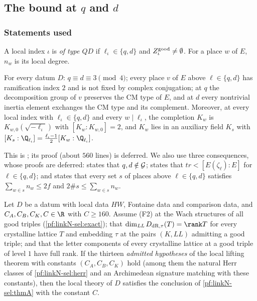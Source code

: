\subsection{The bound at \texorpdfstring{$q$}{q} and \texorpdfstring{$d$}{d}}\label{sec:pf:linkN-sel:thmB}

\subsubsection{Statements used}

A local index $\iota$ is \emph{of type $QD$} if $\ell_\iota\in\{q,d\}$ and $Z^{\mathrm{good}}_\iota\ne\emptyset$. For a place $w$ of $E$, $n_w$
is its local degree.

\begin{lemma}\label{pf:linkN-sel:qdfields}
For every datum $D$: $q\equiv d\equiv3\pmod4$; every place $v$ of $E$ above $\ell\in\{q,d\}$ has ramification index $2$ and is not fixed
by complex conjugation; at $q$ the decomposition group of $v$ preserves the CM type of $E$, and at $d$ every nontrivial inertia element
exchanges the CM type and its complement. Moreover, at every local index with $\ell_\iota\in\{q,d\}$ and every $w\mid\ell_\iota$, the
completion $K_w$ is $K_{w,0}(\sqrt{-\ell_\iota})$ with $[K_w:K_{w,0}]=2$, and $K_w$ lies in an auxiliary field $K_s$ with
$[K_s:\Q_{\ell_\iota}]=\frac{\ell_\iota-1}2[K_w:\Q_{\ell_\iota}]$.
\end{lemma}

This is ; its proof (about $560$ lines) is deferred. We also use three
consequences, whose proofs are deferred:  states that $q,d\notin\mathcal G$;
 states that $tr<[E(\zeta_\ell):E]$ for $\ell\in\{q,d\}$; and
 states that every set $s$ of places above $\ell\in\{q,d\}$ satisfies
$\sum_{w\in s}n_w\le2f$ and $2\#s\le\sum_{w\in s}n_w$.

\begin{theorem}\label{pf:linkN-sel:intmetric}
Let $D$ be a datum with local data $HW$, Fontaine data and comparison data, and $C_A,C_B,C_K,C\in\R$ with $C\ge160$. Assume (F2) at the Wach
structures of all good triples (\cref{pf:linkN-sel:exact}); that $\dim_{\mathit{LL}}D_{\mathrm{dR},\tau}(T)=\rank T$ for every crystalline lattice
$T$ and embedding $\tau$ at the pairs $(K,\mathit{LL})$ admitting a good triple; and that the letter components of every crystalline lattice at a
good triple of level $1$ have full rank. If the thirteen \emph{admitted hypotheses} of the local lifting theorem with constants $(C_A,C_B,C_K)$
hold (among them the natural Herr classes of \cref{pf:linkN-sel:herr} and an Archimedean signature matching with these constants), then the
local theory of $D$ satisfies the conclusion of \cref{pf:linkN-sel:thmA} with the constant $C$.
\end{theorem}

